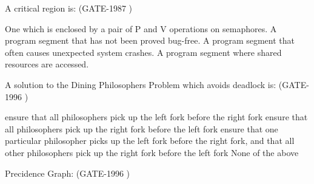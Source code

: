 \vspace{0.08in}


\begin{minipage}{\linewidth}

  \question  A critical region is: (GATE-1987 )

  \begin{choices}
    \choice One which is enclosed by a pair of P and V operations on semaphores.
    \choice A program segment that has not been proved bug-free.
    \choice A program segment that often causes unexpected system crashes.
    \choice A program segment where shared resources are accessed.
  \end{choices}

  \end{minipage}

\vspace{0.08in}


\begin{minipage}{\linewidth}

  \question A solution to the Dining Philosophers Problem which avoids deadlock is: (GATE-1996 )

  \begin{choices}
    \choice ensure that all philosophers pick up the left fork before the right fork
    \choice ensure that all philosophers pick up the right fork before the left fork
    \choice ensure that one particular philosopher picks up the left fork before the right fork, and that all other philosophers pick up the right fork before the left fork
    \choice None of the above
  \end{choices}

  \end{minipage}

\vspace{0.08in}


\begin{minipage}{\linewidth}

  \question Precidence Graph: (GATE-1996 )
  \end{minipage}

\vspace{0.08in}

